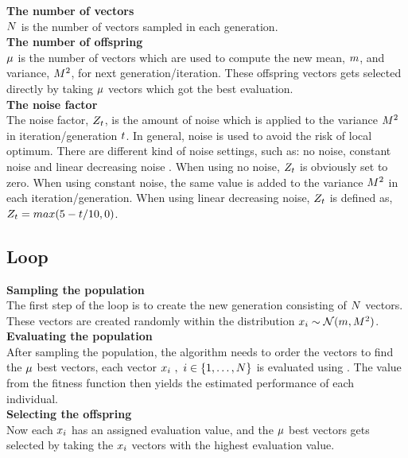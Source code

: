 \textbf{The number of vectors}\\
$N$ is the number of vectors sampled in each generation.
\\

\textbf{The number of offspring}\\
$\mu$ is the number of vectors which are used to compute 
the new mean, $m$, and variance,
$M^2$, for next generation/iteration. 
These offspring vectors gets selected 
directly by taking $\mu$ vectors
which got the best evaluation.
\\

\textbf{The noise factor}\\
The noise factor, $Z_{t}$, is the amount of noise which 
is applied to the variance $M^2$ in iteration/generation 
$t$. In general, noise is used to avoid the risk of local optimum.
There are different kind of noise settings, such as: no noise, constant noise 
and linear decreasing noise \citep{szita:06}. When using no noise, $Z_{t}$ 
is obviously set to zero. When using constant noise, the same value is 
added to the variance $M^2$ in each iteration/generation. 
When using linear decreasing noise, $Z_{t}$ is defined as, 
$Z_{t}=max(5- t /10,0)$.
\\

\subsection{Loop}

\textbf{Sampling the population}\\
The first step of the loop is to create the new generation consisting of $N$ vectors. These vectors are created randomly within the distribution $x_{i}\sim \mathcal{N}(m,M^2)$.
\\

\textbf{Evaluating the population}\\
After sampling the population, the algorithm needs to order the vectors to find the $\mu$ best vectors, each vector $x_{i}\ ,\ i \in \{1, \dots, N\}$ is evaluated using \fitnessFunction. The value from the fitness function then yields the estimated performance of each individual.
\\

\textbf{Selecting the offspring}\\
Now each $x_{i}$ has an assigned evaluation value, and the $\mu$ best vectors gets selected by taking the $x_{i}$ vectors with the highest evaluation value.
\\

